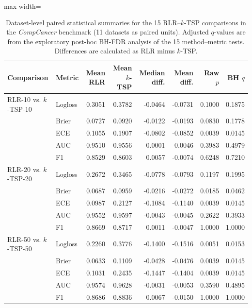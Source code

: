\documentclass[11pt, a4paper]{article}
\begin{document}
\begin{table}[!htbp]
\centering
\caption{Dataset-level paired statistical summaries for the 15 RLR--$k$-TSP comparisons in the \emph{CompCancer} benchmark (11 datasets as paired units). Adjusted $q$-values are from the exploratory post-hoc BH-FDR analysis of the 15 method--metric tests. Differences are calculated as RLR minus $k$-TSP.}
\label{tab:compcancer_stats}
{\scriptsize
\setlength{\tabcolsep}{3pt}
\renewcommand{\arraystretch}{1.15}
\begin{adjustbox}{max width=\linewidth}
\begin{tabular}{llrrrrrr}
\toprule
\textbf{Comparison} &
\textbf{Metric} &
\textbf{Mean RLR} &
\textbf{Mean $k$-TSP} &
\textbf{Median diff.} &
\textbf{Mean diff.} &
\textbf{Raw $p$} &
\textbf{BH $q$} \\
\midrule

RLR-10 vs. $k$-TSP-10
& Logloss & 0.3051 & 0.3782 & -0.0464 & -0.0731 & 0.1000 & 0.1875 \\
& Brier   & 0.0727 & 0.0920 & -0.0122 & -0.0193 & 0.0830 & 0.1778 \\
& ECE     & 0.1055 & 0.1907 & -0.0802 & -0.0852 & 0.0039 & 0.0145 \\
& AUC     & 0.9510 & 0.9556 &  0.0001 & -0.0046 & 0.3983 & 0.4979 \\
& F1      & 0.8529 & 0.8603 &  0.0057 & -0.0074 & 0.6248 & 0.7210 \\

\midrule

RLR-20 vs. $k$-TSP-20
& Logloss & 0.2672 & 0.3465 & -0.0778 & -0.0793 & 0.1197 & 0.1995 \\
& Brier   & 0.0687 & 0.0959 & -0.0216 & -0.0272 & 0.0185 & 0.0462 \\
& ECE     & 0.0987 & 0.2127 & -0.1084 & -0.1140 & 0.0039 & 0.0145 \\
& AUC     & 0.9552 & 0.9597 & -0.0043 & -0.0045 & 0.2622 & 0.3933 \\
& F1      & 0.8669 & 0.8717 &  0.0011 & -0.0047 & 1.0000 & 1.0000 \\

\midrule

RLR-50 vs. $k$-TSP-50
& Logloss & 0.2260 & 0.3776 & -0.1400 & -0.1516 & 0.0051 & 0.0153 \\
& Brier   & 0.0633 & 0.1109 & -0.0428 & -0.0476 & 0.0039 & 0.0145 \\
& ECE     & 0.1031 & 0.2435 & -0.1447 & -0.1404 & 0.0039 & 0.0145 \\
& AUC     & 0.9574 & 0.9628 & -0.0031 & -0.0053 & 0.3590 & 0.4895 \\
& F1      & 0.8686 & 0.8836 &  0.0067 & -0.0150 & 1.0000 & 1.0000 \\

\bottomrule
\end{tabular}
\end{adjustbox}
}
\end{table}
\end{document}
